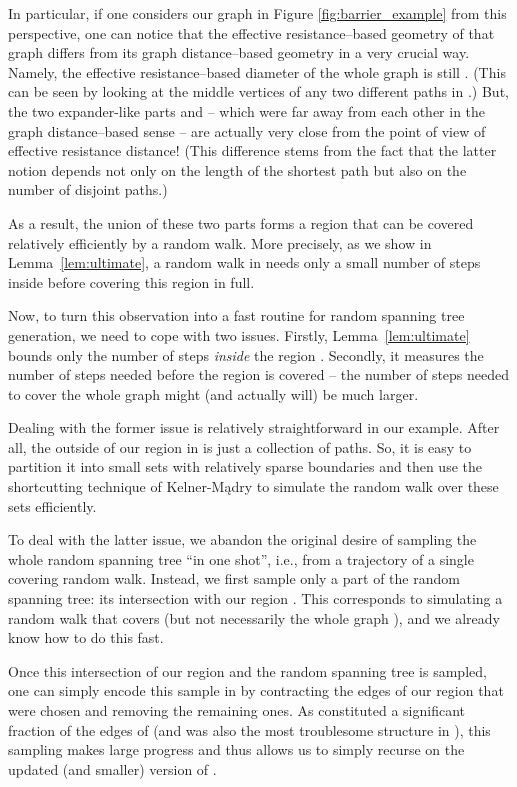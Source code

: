 \documentclass[11pt, letterpaper]{article}
\begin{document}
In particular, if one considers our graph in Figure \ref{fig:barrier_example} from this perspective, one can notice that the effective resistance--based geometry of that graph differs from its graph distance--based geometry in a very crucial way. Namely, the effective resistance--based diameter of the whole graph is still . (This can be seen by looking at the middle vertices of any two different paths in .) But, the two expander-like parts  and  -- which were far away from each other in the graph distance--based sense -- are actually very close from the point of view of effective resistance distance! (This difference stems from the fact that the latter notion depends not only on the length of the shortest path but also on the number of disjoint paths.) 

As a result, the union  of these two parts forms a region that can be covered relatively efficiently by a random walk. More precisely, as we show in Lemma~\ref{lem:ultimate}, a random walk in  needs only a small number of steps {inside}  before covering this region in full. 

Now, to turn this observation into a fast routine for random spanning tree generation, we need to cope with two issues. Firstly, Lemma~\ref{lem:ultimate} bounds only the number of steps {\em inside} the region . Secondly, it measures the number of steps needed before the region is covered -- the number of steps needed to cover the whole graph  might (and actually will) be much larger. 

Dealing with the former issue is relatively straightforward in our example. After all, the outside of our region in  is just a collection of paths. So, it is easy to partition it into small sets with relatively sparse boundaries and then use the shortcutting technique of Kelner-Mądry to simulate the random walk over these sets efficiently. 

To deal with the latter issue, we abandon the original desire of sampling the whole random spanning tree ``in one shot'', i.e., from a trajectory of a single covering random walk. Instead, we first sample only a part of the random spanning tree: its intersection with our region . This corresponds to simulating a random walk that covers  (but not necessarily the whole graph ), and we already know how to do this fast. 

Once this intersection of our region and the random spanning tree is sampled, one can simply encode this sample in  by contracting the edges of our region that were chosen and removing the remaining ones. As  constituted a significant fraction of the edges of  (and was also the most troublesome structure in ), this sampling makes large progress and thus allows us to simply recurse on the updated (and smaller) version of .  
\end{document}
